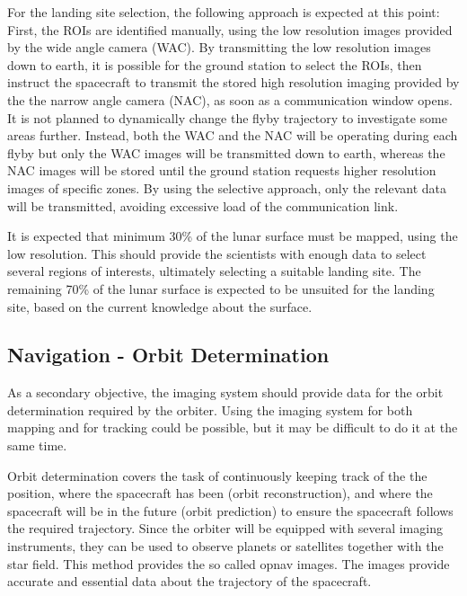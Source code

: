 For the landing site selection, the following approach is expected at this point: First, the ROIs are identified manually, using the low resolution images provided by the wide angle camera (WAC). By transmitting the low resolution images down to earth, it is possible for the ground station to select the ROIs, then instruct the spacecraft to transmit the stored high resolution imaging provided by the the narrow angle camera (NAC), as soon as a communication window opens.
It is not planned to dynamically change the flyby trajectory to investigate some areas further. Instead, both the WAC and the NAC will be operating during each flyby but only the WAC images will be transmitted down to earth, whereas the NAC images will be stored until the ground station requests higher resolution images of specific zones. By using the selective approach, only the relevant data will be transmitted, avoiding excessive load of the communication link.

It is expected that minimum 30\% of the lunar surface must be mapped, using the low resolution. This should provide the scientists with enough data to select several regions of interests, ultimately selecting a suitable landing site. The remaining 70\% of the lunar surface is expected to be unsuited for the landing site, based on the  current knowledge about the surface.
\subsection{Navigation - Orbit Determination}
As a secondary objective, the imaging system should provide data for the orbit determination required by the orbiter. Using the imaging system for both mapping and for tracking could be possible, but it may be difficult to do it at the same time. 

Orbit determination covers the task of continuously keeping track of the the position, where the spacecraft has been (orbit reconstruction), and where the spacecraft will be in the future (orbit prediction)\cite{doody2011spacefl} to ensure the spacecraft follows the required trajectory. Since the orbiter will be equipped with several imaging instruments, they can be used to observe planets or satellites together with the star field. This method provides the so called opnav images\cite{doody2011spacefl}. The images provide accurate and essential data about the trajectory of the spacecraft.  %

